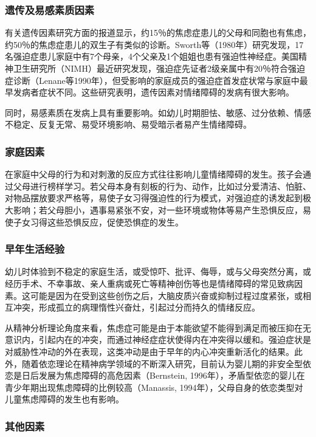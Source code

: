 \subsubsection{遗传及易感素质因素}

有关遗传因素研究方面的报道显示，约15％的焦虑症患儿的父母和同胞也有焦虑，约50％的焦虑症患儿的双生子有类似的诊断。Sworth等（1980年）研究发现，17名强迫症患儿家庭中有7个母亲，4个父亲及1个姐姐也患有强迫性神经症。美国精神卫生研究所（NIMH）最近研究发现，强迫症先证者2级亲属中有20％符合强迫症诊断（Lenane等1990年），但受影响的家庭成员的强迫症首发症状常与家庭中最早发病者症状不同。这些研究表明，遗传因素对情绪障碍的发病有很大影响。

同时，易感素质在发病上具有重要影响。如幼儿时期胆怯、敏感、过分依赖、情感不稳定、反复无常、易受环境影响、易受暗示者易产生情绪障碍。

\subsubsection{家庭因素}

在家庭中父母的行为和对刺激的反应方式往往影响儿童情绪障碍的发生。孩子会通过父母进行榜样学习。若父母本身有刻板的行为、动作，比如过分爱清洁、怕脏、对物品摆放要求严格等，易使子女习得强迫性的行为模式，对强迫症的诱发起到极大影响；若父母胆小，遇事易紧张不安，对一些环境或物体等易产生恐惧反应，易使子女习得这些恐惧反应，促使恐惧症的发生。

\subsubsection{早年生活经验}

幼儿时体验到不稳定的家庭生活，或受惊吓、批评、侮辱，或与父母突然分离，或经历手术、不幸事故、亲人重病或死亡等精神创伤等也是情绪障碍的常见致病因素。这可能是因为在受到这些创伤之后，大脑皮质兴奋或抑制过程过度紧张，或相互冲突，形成孤立的病理惰性兴奋灶，引起过分而持久的情绪反应。

从精神分析理论角度来看，焦虑症可能是由于本能欲望不能得到满足而被压抑在无意识内，引起内在的冲突，而通过神经症症状使得内在冲突得以缓和。强迫症状是对威胁性冲动的外在表现，这类冲动是由于早年的内心冲突重新活化的结果。此外，随着依恋理论在精神病学领域的不断深入研究，目前认为婴儿期的非安全型依恋是日后发展为焦虑障碍的高危因素（Bernstein,
1996年），矛盾型依恋的婴儿在青少年期出现焦虑障碍的比例较高（Manassis,
1994年），父母自身的依恋类型对儿童焦虑障碍的发生也有影响。

\subsubsection{其他因素}

